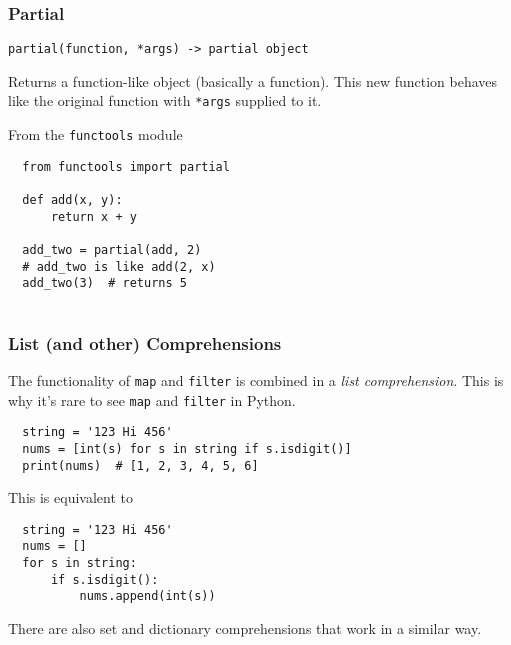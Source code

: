 \documentclass[10pt]{beamer}
\begin{document}
\begin{frame}[fragile]
  \frametitle{Partial}
  \texttt{partial(function, *args) -> partial object}
  
  Returns a function-like object (basically a function). This new function
  behaves like the original function with \texttt{*args} supplied to it. 
  
  From the \texttt{functools} module    
  \begin{verbatim}
  from functools import partial
            
  def add(x, y):
      return x + y
  
  add_two = partial(add, 2) 
  # add_two is like add(2, x)
  add_two(3)  # returns 5    
        
  \end{verbatim}           
  
\end{frame}

\begin{frame}[fragile]
  \frametitle{List (and other) Comprehensions}
  
  
  The functionality of \texttt{map} and \texttt{filter} is combined in 
  a \emph{list comprehension}. This is why it's rare to see \texttt{map} and
  \texttt{filter} in Python. 
  
   
  \begin{verbatim}
  string = '123 Hi 456'
  nums = [int(s) for s in string if s.isdigit()]
  print(nums)  # [1, 2, 3, 4, 5, 6]        
  \end{verbatim} 
  
  This is equivalent to
  \begin{verbatim}
  string = '123 Hi 456'
  nums = []
  for s in string:
      if s.isdigit():
          nums.append(int(s))   
  \end{verbatim} 
 There are also set and dictionary comprehensions that work in a similar way.           
  
\end{frame}
\end{document}
